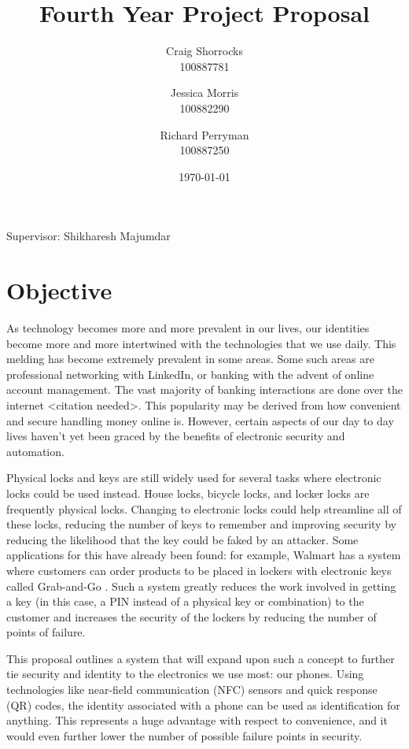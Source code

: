 \documentclass{article}
\title{Fourth Year Project Proposal}
\author{
	Craig Shorrocks \\
	100887781
	\and
	Jessica Morris \\
	100882290
	\and
	Richard Perryman \\
	100887250
}
\date{\today}
\begin{document}
\maketitle

\begin{center}
Supervisor: Shikharesh Majumdar 
\end{center}

\pagebreak

\section{Objective}

As technology becomes more and more prevalent in our lives, our identities become more and more intertwined with the technologies that we use daily. This melding has become extremely prevalent in some areas. Some such areas are professional networking with LinkedIn, or banking with the advent of online account management. The vast majority of banking interactions are done over the internet \textless citation needed\textgreater. This popularity may be derived from how convenient and secure handling money online is. However, certain aspects of our day to day lives haven't yet been graced by the benefits of electronic security and automation.

Physical locks and keys are still widely used for several tasks where electronic locks could be used instead. House locks, bicycle locks, and locker locks are frequently physical locks. Changing to electronic locks could help streamline all of these locks, reducing the number of keys to remember and improving security by reducing the likelihood that the key could be faked by an attacker. Some applications for this have already been found: for example, Walmart has a system where customers can order products to be placed in lockers with electronic keys called Grab-and-Go \autocite{WALMART}. Such a system greatly reduces the work involved in getting a key (in this case, a PIN instead of a physical key or combination) to the customer and increases the security of the lockers by reducing the number of points of failure.

This proposal outlines a system that will expand upon such a concept to further tie security and identity to the electronics we use most: our phones. Using technologies like near-field communication (NFC) sensors and quick response (QR) codes, the identity associated with a phone can be used as identification for anything. This represents a huge advantage with respect to convenience, and it would even further lower the number of possible failure points in security.
\end{document}

